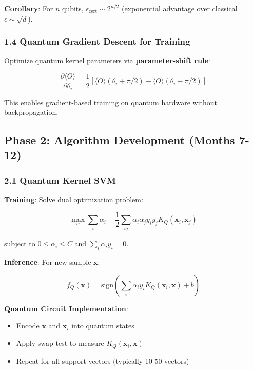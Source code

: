 \documentclass[11pt]{article}
\begin{document}
\textbf{Corollary}: For $n$ qubits, $\epsilon_{\text{cert}} \sim 2^{n/2}$ (exponential advantage over classical $\epsilon \sim \sqrt{d}$).

\subsubsection{1.4 Quantum Gradient Descent for Training}

Optimize quantum kernel parameters via \textbf{parameter-shift rule}:

\begin{equation}
\frac{\partial \langle O \rangle}{\partial \theta_i} = \frac{1}{2} \left[ \langle O \rangle(\theta_i + \pi/2) - \langle O \rangle(\theta_i - \pi/2) \right]
\end{equation}

This enables gradient-based training on quantum hardware without backpropagation.

\subsection{Phase 2: Algorithm Development (Months 7-12)}

\subsubsection{2.1 Quantum Kernel SVM}

\textbf{Training}: Solve dual optimization problem:

\begin{equation}
\max_{\alpha} \sum_i \alpha_i - \frac{1}{2} \sum_{ij} \alpha_i \alpha_j y_i y_j K_Q(\mathbf{x}_i, \mathbf{x}_j)
\end{equation}

subject to $0 \leq \alpha_i \leq C$ and $\sum_i \alpha_i y_i = 0$.

\textbf{Inference}: For new sample $\mathbf{x}$:

\begin{equation}
f_Q(\mathbf{x}) = \text{sign}\left( \sum_i \alpha_i y_i K_Q(\mathbf{x}_i, \mathbf{x}) + b \right)
\end{equation}

\textbf{Quantum Circuit Implementation}:
\begin{itemize}
    \item Encode $\mathbf{x}$ and $\mathbf{x}_i$ into quantum states
    \item Apply swap test to measure $K_Q(\mathbf{x}_i, \mathbf{x})$
    \item Repeat for all support vectors (typically 10-50 vectors)
\end{itemize}
\end{document}
